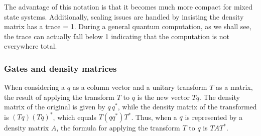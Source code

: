  The advantage of this notation is
that it becomes much more compact for mixed state systems. Additionally,
scaling issues are handled by insisting the density matrix has a trace = 1.
During a general quantum computation, as we shall see,
the trace can actually fall below 1 indicating
that the computation is not everywhere total.

\subsubsection{Gates and density matrices}\label{app:subsubsecGatesAndDensityMatrices}
When considering  a \qubit{} $q$ as a column vector and
a unitary  transform $T$ as a matrix, the  result of applying the transform
$T$ to $q$ is the new vector $T q$. The
 density matrix of the original \qubit{} is given by $q\, q^{*}$, while
the density matrix of the transformed \qubit{} is
$(T q) ( T q)^{*}$, which equals $ T (q q^{*}) T^{*}$. Thus, when
a \qubit{} $q$ is represented by a density matrix $A$, the
formula for applying the transform $T$ to $q$ is $T A T^{*}$.

